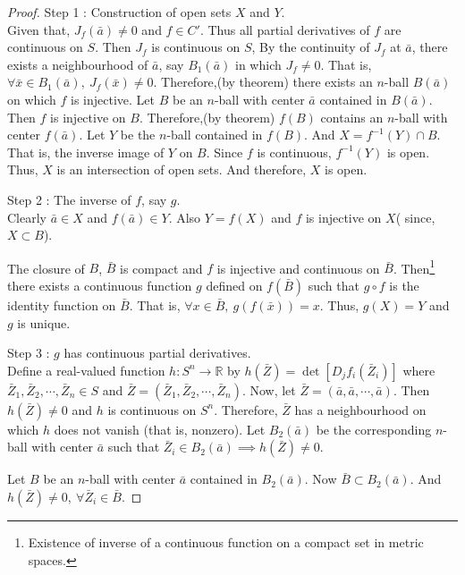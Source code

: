 \begin{proof}
	Step 1 : Construction of open sets $X$ and $Y$.\\
	Given that, $J_f(\bar{a}) \ne 0$ and $f \in C'$.
	Thus all partial derivatives of $f$ are continuous on $S$.
	Then $J_f$ is continuous on $S$, 
	By the continuity of $J_f$ at $\bar{a}$, there exists a neighbourhood of $\bar{a}$, say $B_1(\bar{a})$ in which $J_f \ne 0$.
	That is, $\forall \bar{x} \in B_1(\bar{a}),\ J_f(\bar{x}) \ne 0$.
	Therefore,(by theorem) there exists an $n$-ball $B(\bar{a})$ on which $f$ is injective.
	Let $B$ be an $n$-ball with center $\bar{a}$ contained in $B(\bar{a})$.
	Then $f$ is injective on $B$.
	Therefore,(by theorem) $f(B)$ contains an $n$-ball with center $f(\bar{a})$.
	Let $Y$ be the $n$-ball contained in $f(B)$.
	And  $X=f^{-1}(Y) \cap B$.
	That is, the inverse image of $Y$ on $B$.
	Since $f$ is continuous, $f^{-1}(Y)$ is open.
	Thus, $X$ is an intersection of open sets.
	And therefore, $X$ is open.

	Step 2 : The inverse of $f$, say $g$.\\
	Clearly $\bar{a} \in X$ and $f(\bar{a}) \in Y$.
	Also $Y = f(X)$ and $f$ is injective on $X$( since, $X \subset B$).
	
	The closure of $B$, $\bar{B}$ is compact and $f$ is injective and continuous on $\bar{B}$.
	Then\footnote{Existence of inverse of a continuous function on a compact set in metric spaces.} there exists a continuous function $g$ defined on $f(\bar{B})$ such that $g \circ f$ is the identity function on $\bar{B}$.
	That is, $\forall x \in \bar{B},\ g(f(\bar{x})) = x$.
	Thus, $g(X) = Y$ and $g$ is unique.

	Step 3 : $g$ has continuous partial derivatives.\\
	Define a real-valued function $h : S^n \to \mathbb{R}$ by $h(\bar{Z}) = \det[D_jf_i(\bar{Z}_i)]$ where $\bar{Z}_1,\bar{Z}_2,\cdots,\bar{Z}_n \in S$ and $\bar{Z} = (\bar{Z}_1,\bar{Z}_2,\cdots,\bar{Z}_n)$.
	Now, let $\bar{Z} = (\bar{a},\bar{a},\cdots,\bar{a})$.
	Then $h(\bar{Z}) \ne 0$ and $h$ is continuous on $S^n$.
	Therefore, $\bar{Z}$ has a neighbourhood on which $h$ does not vanish (that is, nonzero).
	Let $B_2(\bar{a})$ be the corresponding $n$-ball with center $\bar{a}$ such that $\bar{Z}_i \in B_2(\bar{a}) \implies h(\bar{Z}) \ne 0$.

	Let $B$ be an $n$-ball with center $\bar{a}$ contained in $B_2(\bar{a})$.
	Now $\bar{B} \subset B_2(\bar{a})$.
	And $h(\bar{Z}) \ne 0,\ \forall \bar{Z}_i \in \bar{B}$.


\end{proof}
